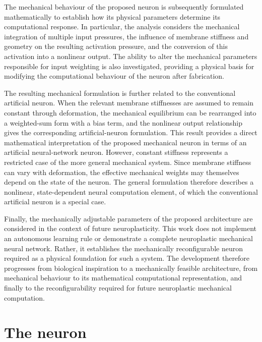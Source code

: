 \documentclass[11pt,a4paper]{article}
\numberwithin{equation}{section}
\begin{document}
The mechanical behaviour of the proposed neuron is subsequently formulated mathematically to establish how its
physical parameters determine its computational response. In particular, the analysis considers the mechanical
integration of multiple input pressures, the influence of membrane stiffness and geometry on the resulting
activation pressure, and the conversion of this activation into a nonlinear output. The ability to alter the
mechanical parameters responsible for input weighting is also investigated, providing a physical basis for
modifying the computational behaviour of the neuron after fabrication.

The resulting mechanical formulation is further related to the conventional artificial neuron. When the relevant
membrane stiffnesses are assumed to remain constant through deformation, the mechanical equilibrium can be
rearranged into a weighted-sum form with a bias term, and the nonlinear output relationship gives the corresponding
artificial-neuron formulation. This result provides a direct mathematical interpretation of the proposed mechanical
neuron in terms of an artificial neural-network neuron. However, constant stiffness represents a restricted case of
the more general mechanical system. Since membrane stiffness can vary with deformation, the effective mechanical
weights may themselves depend on the state of the neuron. The general formulation therefore describes a nonlinear,
state-dependent neural computation element, of which the conventional artificial neuron is a special case.

Finally, the mechanically adjustable parameters of the proposed architecture are considered in the context of
future neuroplasticity. This work does not implement an autonomous learning rule or demonstrate a complete
neuroplastic mechanical neural network. Rather, it establishes the mechanically reconfigurable neuron required as a
physical foundation for such a system. The development therefore progresses from biological inspiration to a
mechanically feasible architecture, from mechanical behaviour to its mathematical computational representation, and
finally to the reconfigurability required for future neuroplastic mechanical computation.

\section{The neuron}
\end{document}

